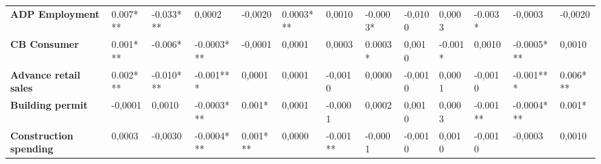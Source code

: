 \begin{landscape}
\begin{table}[]
{\begin{tabular}{@{}lllllllllllll@{}}
\textbf{ADP Employment}           & 0.007***                                & -0.033***                               & 0,0002                                  & -0,0020                                 & 0.0003***                               & 0,0010                                  & -0.0003*                                & -0,0100                                 & 0,0003                                  & -0.003*                                 & -0,0003                                 & -0,0020                                 \\
\textbf{CB Consumer}              & 0.001***                                & -0.006*                                 & -0.0003***                              & -0,0001                                 & 0,0001                                  & 0,0003                                  & 0.0003*                                 & 0,0010                                  & -0.001*                                 & 0,0010                                  & -0.0005***                              & 0,0010                                  \\
\textbf{Advance retail sales}     & 0.002***                                & -0.010***                               & -0.001***                               & 0,0001                                  & 0,0001                                  & -0,0010                                 & 0,0000                                  & -0,0010                                 & 0,0001                                  & -0,0010                                 & -0.001***                               & 0.006***                                \\
\textbf{Building permit}          & -0,0001                                 & 0,0010                                  & -0.0003***                              & 0.001*                                  & 0,0001                                  & -0,0001                                 & 0,0002                                  & 0,0010                                  & 0,0003                                  & -0.001**                                & -0.0004***                              & 0.001*                                  \\
\textbf{Construction spending}    & 0,0003                                  & -0,0030                                 & -0.0004***                              & 0.001***                                & 0,0000                                  & -0.001**                                & -0,0001                                 & -0,0010                                 & 0,0010                                  & -0,0010                                 & -0,0003                                 & 0,0010                                  \\

\end{tabular}}
\end{table}
\end{landscape}
